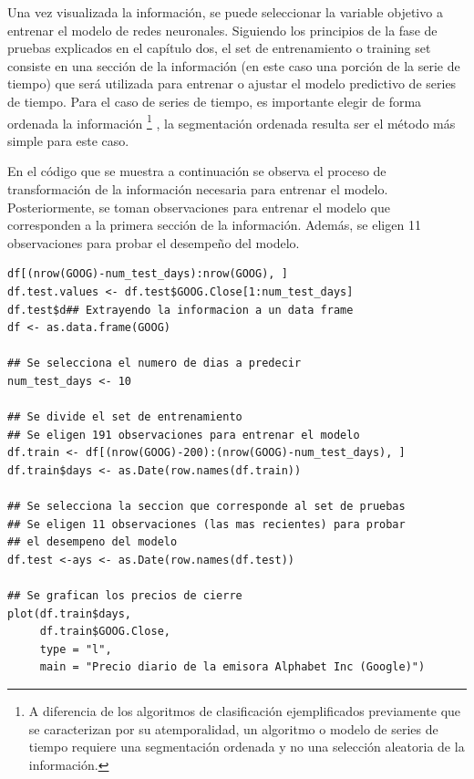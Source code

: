 \documentclass[letterpaper,12pt, spanish, oneside]{book} %
\let\oldfootnote\footnote
\renewcommand{\footnote}[1]{%
  \begingroup%
  \linespread{1.2}%
  \oldfootnote{#1}%
  \endgroup%
}
\begin{document}
Una vez visualizada la información, se puede seleccionar la variable objetivo a entrenar el modelo de redes neuronales. Siguiendo los principios de la fase de pruebas explicados en el capítulo dos, el set de entrenamiento o training set consiste en una sección de la información (en este caso una porción de la serie de tiempo) que será utilizada para entrenar o ajustar el modelo predictivo de series de tiempo. Para el caso de series de tiempo, es importante elegir de forma ordenada la información\footnote{A diferencia de los algoritmos de clasificación ejemplificados previamente que se caracterizan por su atemporalidad, un algoritmo o modelo de series de tiempo requiere una segmentación ordenada y no una selección aleatoria de la información.}, la segmentación ordenada resulta ser el método más simple para este caso. 

En el código que se muestra a continuación se observa el proceso de transformación de la información necesaria para entrenar el modelo. Posteriormente, se toman observaciones para entrenar el modelo que corresponden a la primera sección de la información. Además, se eligen 11 observaciones para probar el desempeño del modelo.

\begin{lstlisting}
df[(nrow(GOOG)-num_test_days):nrow(GOOG), ]
df.test.values <- df.test$GOOG.Close[1:num_test_days] 
df.test$d## Extrayendo la informacion a un data frame
df <- as.data.frame(GOOG)

## Se selecciona el numero de dias a predecir
num_test_days <- 10

## Se divide el set de entrenamiento
## Se eligen 191 observaciones para entrenar el modelo
df.train <- df[(nrow(GOOG)-200):(nrow(GOOG)-num_test_days), ]
df.train$days <- as.Date(row.names(df.train))

## Se selecciona la seccion que corresponde al set de pruebas
## Se eligen 11 observaciones (las mas recientes) para probar
## el desempeno del modelo
df.test <-ays <- as.Date(row.names(df.test))

## Se grafican los precios de cierre
plot(df.train$days, 
     df.train$GOOG.Close, 
     type = "l", 
     main = "Precio diario de la emisora Alphabet Inc (Google)")
\end{lstlisting}
\end{document}
